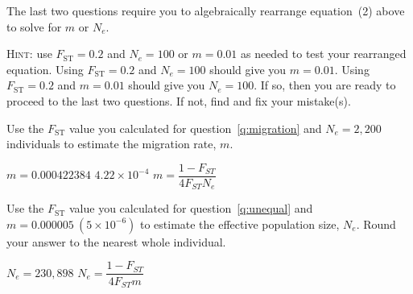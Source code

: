 \documentclass[12pt, addpoints, hidelinks]{exam}
\newcommand{\fst}{$F_{\mathrm{ST}}$}
\begin{document}
\begin{questions}
\newpage

The last two questions require you to algebraically rearrange equation~(2) above to solve for $m$ or $N_e$.

\textsc{Hint:} use $F_\mathrm{ST} = 0.2$ and $N_e = 100$ or $m = 0.01$ as needed to test your rearranged equation. Using $F_\mathrm{ST} = 0.2$ and $N_e = 100$ should give you $m = 0.01$. Using $F_\mathrm{ST} = 0.2$ and $m = 0.01$ should give you $N_e = 100$. If so, then you are ready to proceed to the last two questions. If not, find and fix your mistake(s).

\question[4]
Use the \fst{} value you calculated for question~\ref{q:migration} and $N_e = 2,200$ individuals to estimate the migration rate, $m$. 

\ifprintanswers 
	$m = 0.000422384$ \quad $4.22 \times 10^{-4}$ \hfill $m = \dfrac{1-F_{ST}}{4F_{ST}N_e}$
	
	\vspace{2\baselineskip} 
\else 
	\vspace{3\baselineskip}
\fi

\question[4]
Use the \fst{} value you calculated for question~\ref{q:unequal} and $m = 0.000005\ (5\times 10^{-6})$ to estimate the effective population size, $N_e$. Round your answer to the nearest whole individual.

\ifprintanswers 
	$N_e = 230,898$ \hfill $N_e = \dfrac{1-F_{ST}}{4F_{ST}m}$\newline
	\vspace{\baselineskip}
\else 
	\vspace{2\baselineskip} 
\fi

\end{questions}
\end{document}
